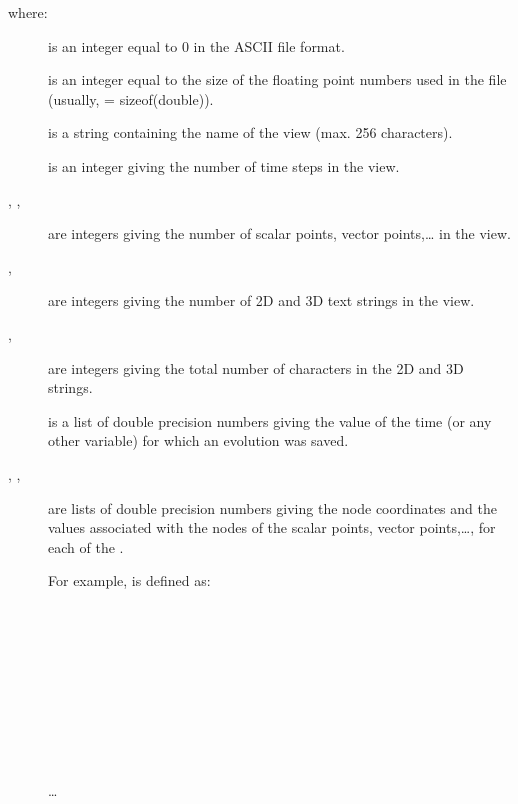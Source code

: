 where:
\begin{description}
\item[]
is an integer equal to 0 in the ASCII file format.

\item[]
is an integer equal to the size of the floating point numbers used in the
file (usually,  = sizeof(double)).

\item[]
is a string containing the name of the view (max. 256 characters).

\item[]
is an integer giving the number of time steps in the view.

\item[, , \vari{\dots}]
are integers giving the number of scalar points, vector points,\dots
in the view.

\item[, ]
are integers giving the number of 2D and 3D text strings in the
view. 

\item[, ]
are integers giving the total number of characters in the 2D and 3D strings.

\item[]
is a list of  double precision numbers giving the value
of the time (or any other variable) for which an evolution was saved.

\item[, , \vari{\dots}]
are lists of double precision numbers giving the node coordinates and the
values associated with the nodes of the  scalar
points,  vector points,\dots, for each of the
.

For example,  is defined as:
\begin{fileformat}
  \\
  \\
  \\
  \\
  \\
  \\
  \\
  \\
  \\
\dots
\end{fileformat}


\end{description}
